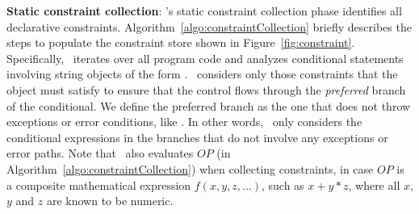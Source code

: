 \begin{mylist}

 \item \textbf{Static constraint collection}: \tool's static constraint
collection phase identifies all declarative constraints.
Algorithm~\ref{algo:constraintCollection} briefly describes the steps to
populate the constraint store shown in Figure~\ref{fig:constraint}.
Specifically, \tool\ iterates over all program code and analyzes conditional
statements involving string objects of the form .
\tool\ considers only those constraints that the object must satisfy to ensure
that the control flows through the \textit{preferred} branch of the conditional.
We define the preferred branch as the one that does not throw exceptions or
error conditions, like . In other words, \tool\ only
considers the conditional expressions in the branches that do not involve any
exceptions or error paths. Note that \tool\ also evaluates $OP$ (in
Algorithm~\ref{algo:constraintCollection}) when collecting constraints, in case
$OP$ is a composite mathematical expression $f(x,y,z,...)$, such as $x + y * z$,
where all $x$, $y$ and $z$ are known to be numeric.

\begin{algorithm}[t]
\scriptsize
\DontPrintSemicolon
{}
\end{algorithm}
\end{mylist}
